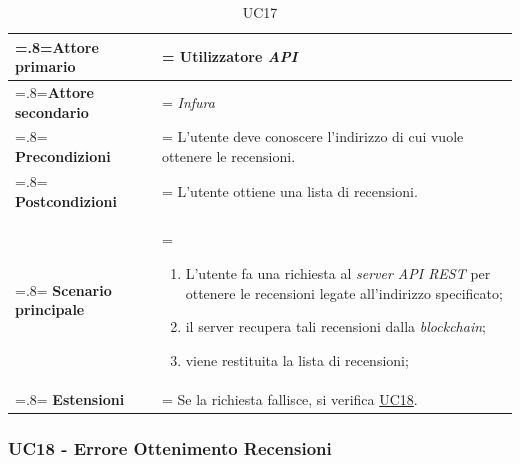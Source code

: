             \begin{table}[H]
                \centering
                \renewcommand{\arraystretch}{1.8}
                \renewcommand\tabularxcolumn[1]{m{#1}}
                \begin{tabularx}{0.9\textwidth} {
                    >{\hsize=.8\hsize\linewidth=\hsize}X
                    >{\hsize=1.2\hsize\linewidth=\hsize}X}
                \hline
                \textbf{Attore primario} & Utilizzatore \textit{API} \\
                \hline
                \textbf{Attore secondario} & \textit{Infura} \\
                \hline
                \textbf{Precondizioni} & L'utente deve conoscere l'indirizzo di cui vuole ottenere le recensioni. \\
                \hline
                \textbf{Postcondizioni} & L'utente ottiene una lista di recensioni. \\
                \hline
                \textbf{Scenario principale} &
                    \begin{enumerate}
                        \item L'utente fa una richiesta al \textit{server API REST} per ottenere le recensioni legate all'indirizzo specificato;
                        \item il server recupera tali recensioni dalla \textit{blockchain};
                        \item viene restituita la lista di recensioni;
                    \end{enumerate} \\
                \hline
                \textbf{Estensioni} & Se la richiesta fallisce, si verifica \hyperref[UC18]{UC18}. \\
                \hline
                \end{tabularx}
                \caption{UC17}
            \end{table}

        \subsubsection{UC18 - Errore Ottenimento Recensioni}
        \label{UC18}

